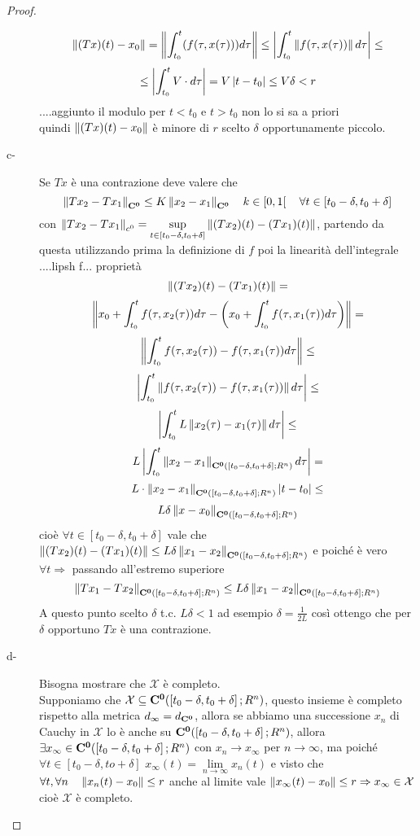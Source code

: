 \begin{proof}
\begin{description}
		$$\left\|(Tx)(t) - x_0\right\| = \left\|\int_{t_0}^t(f(\tau,x(\tau)))d\tau\right\| \le \left|\int_{t_0}^t \left\|f(\tau,x(\tau))\right\|d\tau\right|\le$$
		$$\le\left|\int_{t_0}^t V\cdot d\tau\right|=V\left|t-t_0\right|\le V\delta<r$$
		....aggiunto il modulo per $t<t_0$ e $t>t_0$ non lo si sa a priori\\
		quindi $\left\|(Tx)(t) - x_0\right\|$ è minore di $r$ scelto $\delta$ opportunamente piccolo. 
		\item[c-] Se $Tx$ è una contrazione deve valere che
		$$\left\|Tx_2 - Tx_1\right\|_{\mathbf{C^{0}}}\le K\left\|x_2-x_1\right\|_{\mathbf{C^{0}}}\quad k\in\left[0,1\right[\quad\forall t\in\left[t_0-\delta,t_0+\delta\right]$$
		con $\left\|Tx_2-Tx_1\right\|_{c^0}=\sup\limits_{t\in\left[t_0-\delta,t_0+\delta\right]}\left\|(Tx_2)(t) - (Tx_1)(t)\right\|$, partendo da questa utilizzando prima la definizione di $f$ poi la linearità dell'integrale ....lipsh f... proprietà
		$$\left\|(Tx_2)(t) - (Tx_1)(t)\right\|=$$
		$$\left\|x_0+\int_{t_0}^t f(\tau,x_2(\tau)) d\tau - \left(x_0+\int_{t_0}^t f(\tau,x_1(\tau)) d\tau\right)\right\|=$$
		$$\left\|\int_{t_0}^t f(\tau,x_2(\tau))-f(\tau,x_1(\tau)) d\tau\right\|\le$$
		$$\left|\int_{t_0}^t \left\|f(\tau,x_2(\tau))-f(\tau,x_1(\tau))\right\| d\tau\right|\le$$
		$$\left|\int_{t_0}^t L\left\|x_2(\tau)-x_1(\tau)\right\| d\tau\right|\le$$
		$$L\left|\int_{t_0}^t \left\|x_2-x_1\right\|_{\mathbf{C^{0}}(\left[t_0-\delta,t_0+\delta\right];R^n)} d\tau\right|=$$
		$$L\cdot \left\|x_2-x_1\right\|_{\mathbf{C^{0}}(\left[t_0-\delta,t_0+\delta\right];R^n)}\left|t-t_0\right|\le$$
		$$L\delta\left\|x-x_0\right\|_{\mathbf{C^{0}}(\left[t_0-\delta,t_0+\delta\right];R^n)}$$
		cioè $\forall t \in \left[t_0-\delta,t_0+\delta\right]$ vale che $\left\|(Tx_2)(t)-(Tx_1)(t)\right\|\le L\delta\left\|x_1-x_2\right\|_{\mathbf{C^{0}}(\left[t_0-\delta,t_0+\delta\right];R^n)}$ e poiché è vero $\forall t \Rightarrow $ passando all'estremo superiore
		$$ \left\|Tx_1 - Tx_2\right\|_{\mathbf{C^{0}}(\left[t_0-\delta,t_0+\delta\right];R^n)}\le L\delta\left\|x_1-x_2\right\|_{\mathbf{C^{0}}(\left[t_0-\delta,t_0+\delta\right];R^n)}$$
		A questo punto scelto $\delta$ t.c. $L\delta<1$ ad esempio $\delta=\frac{1}{2L}$ così ottengo che per $\delta$ opportuno $Tx$ è una contrazione.		
		\item[d-] Bisogna mostrare che $\mathcal{X}$ è completo.\\
		Supponiamo che $\mathcal{X}\subseteq \mathbf{C^{0}}(\left[t_0-\delta,t_0+\delta\right];R^n)$, questo insieme è completo rispetto alla metrica $d_\infty=d_{\mathbf{C^{0}}}$, allora se abbiamo una successione $x_n$ di Cauchy in $\mathcal{X}$ lo è anche su $\mathbf{C^{0}}(\left[t_0-\delta,t_0+\delta\right];R^n)$, allora $\exists x_\infty\in \mathbf{C^{0}}(\left[t_0-\delta,t_0+\delta\right];R^n)$ con $x_n\to x_\infty$ per $n\to\infty$, ma poiché $\forall t \in\left[t_0-\delta,to+\delta\right]$ $x_\infty(t)=\lim\limits_{n\to\infty}x_n(t)$ e visto che $\forall t,\forall n\quad \left\|x_n(t)-x_0\right\|\le r$ anche al limite vale $\left\|x_{\infty}(t)-x_0\right\|\le r \Rightarrow x_\infty\in\mathcal{X}$ cioè $\mathcal{X}$ è completo.

\end{description}
\end{proof}
